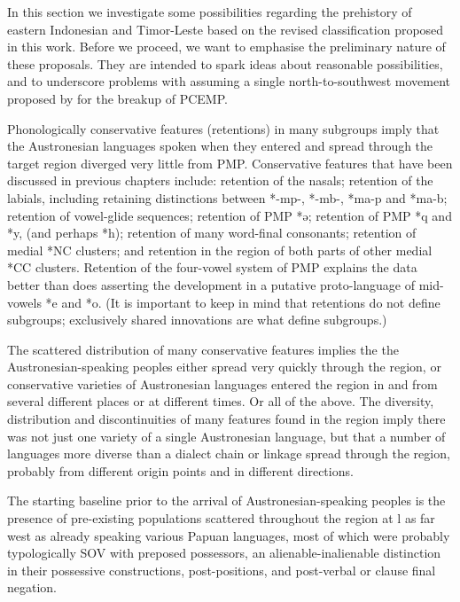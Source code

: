 In this section we investigate some possibilities regarding the
prehistory of eastern Indonesian
and Timor-Leste based on the revised classification proposed in this work.
Before we proceed, we want to emphasise the preliminary nature of these proposals.
They are intended to spark ideas about reasonable possibilities,
and to underscore problems with assuming a single north-to-southwest
movement proposed by \citet[98]{Blust2008} for the breakup of PCEMP.

Phonologically conservative features (retentions) in many subgroups
imply that the Austronesian languages spoken when they entered
and spread through the target region diverged very little from PMP.
Conservative features that have been discussed in previous chapters
include: retention of the nasals; retention of the labials,
including retaining distinctions between *-mp-,
*-mb-, *ma-p and *ma-b; retention of vowel-glide sequences; retention
of PMP *ə; retention of PMP *q
and *y, (and perhaps *h); retention of many word-final consonants;
retention of medial *NC clusters;
and retention in the region of both parts of other medial *CC clusters.
Retention of the four-vowel system of PMP explains the data better
than does asserting the development in a putative proto-language
of mid-vowels *e and *o.
(It is important to keep in mind that retentions do not define
subgroups; exclusively shared innovations are what define subgroups.)

The scattered distribution of many conservative features implies
the the Austronesian-speaking peoples either spread very quickly
through the region, or conservative varieties of Austronesian languages entered the
region in and from several different places or at different times.
Or all of the above.
The diversity, distribution and discontinuities of many features
found in the region imply there was not just one variety of a
single Austronesian language, but that a number of languages more diverse than a dialect chain
or linkage spread through the region,
probably from different origin points
and in different directions.

The starting baseline prior to the arrival of Austronesian-speaking
peoples is the presence of pre-existing populations scattered
throughout the region at l as far west as  already
speaking various Papuan languages,
most of which were probably typologically SOV with preposed possessors,
an alienable-inalienable distinction in their possessive constructions,
post-positions, and post-verbal or clause final negation.


